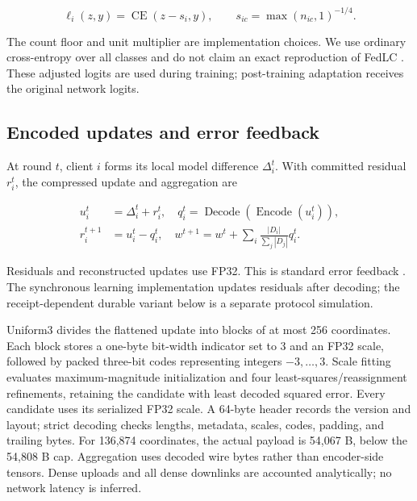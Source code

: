 \begin{equation}
\ell_i(z,y)=\operatorname{CE}(z-s_i,y),\qquad s_{ic}=\max(n_{ic},1)^{-1/4}.
\end{equation}

The count floor and unit multiplier are implementation choices. We use ordinary cross-entropy over all classes and do not claim an exact reproduction of FedLC \cite{zhang2022fedlc}. These adjusted logits are used during training; post-training adaptation receives the original network logits.

\subsection{Encoded updates and error feedback}

At round $t$, client $i$ forms its local model difference $\Delta_i^t$. With committed residual $r_i^t$, the compressed update and aggregation are

\begin{equation}
\begin{aligned}
u_i^t&=\Delta_i^t+r_i^t,\quad q_i^t=\operatorname{Decode}(\operatorname{Encode}(u_i^t)),\\
r_i^{t+1}&=u_i^t-q_i^t,\quad w^{t+1}=w^t+\sum_i\frac{|D_i|}{\sum_j|D_j|}q_i^t.
\end{aligned}
\end{equation}

Residuals and reconstructed updates use FP32. This is standard error feedback \cite{karimireddy2019errorfeedback}. The synchronous learning implementation updates residuals after decoding; the receipt-dependent durable variant below is a separate protocol simulation.

Uniform3 divides the flattened update into blocks of at most 256 coordinates. Each block stores a one-byte bit-width indicator set to 3 and an FP32 scale, followed by packed three-bit codes representing integers $-3,\ldots,3$. Scale fitting evaluates maximum-magnitude initialization and four least-squares/reassignment refinements, retaining the candidate with least decoded squared error. Every candidate uses its serialized FP32 scale. A 64-byte header records the version and layout; strict decoding checks lengths, metadata, scales, codes, padding, and trailing bytes. For 136,874 coordinates, the actual payload is 54,067 B, below the 54,808 B cap. Aggregation uses decoded wire bytes rather than encoder-side tensors. Dense uploads and all dense downlinks are accounted analytically; no network latency is inferred.

